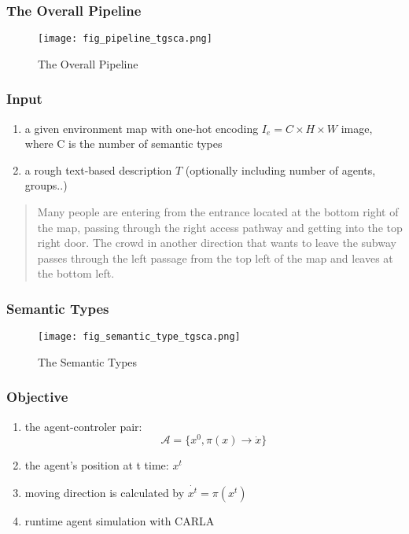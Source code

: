 \begin{frame}
    \frametitle{The Overall Pipeline}
    \begin{figure}
        \texttt{[image: fig\_pipeline\_tgsca.png]}
        \caption{The Overall Pipeline}
    \end{figure}
\end{frame}
\begin{frame}
    \frametitle{Input}
    \begin{enumerate}
        \item a given environment map with one-hot encoding $I_e = C\times H\times W$ image, where C is the number of semantic types
        \item a rough text-based description $T$ (optionally including number of agents, groups..)
    \end{enumerate}
    \begin{quote}
        Many people are entering from the entrance located 
        at the bottom right of the map, 
        passing through the right access pathway 
        and getting into the top right door. 
        The crowd in another direction that 
        wants to leave the subway passes through the left passage 
        from the top left of the map and leaves at the bottom left.
    \end{quote}
\end{frame}
\begin{frame}
    \frametitle{Semantic Types}
    \begin{figure}
        \texttt{[image: fig\_semantic\_type\_tgsca.png]}        
        \caption{The Semantic Types}
    \end{figure}
\end{frame}
\begin{frame}
    \frametitle{Objective}
    \begin{enumerate}
        \item the agent-controler pair: $$\mathcal{A}=\{x^0,\pi(x)\rightarrow \dot{x}\}$$
        \item the agent's position at t time: $x^t$
        \item moving direction is calculated by $\dot{x^t}=\pi(x^t)$
        \item runtime agent simulation with CARLA \cite{dosovitskiyCARLAOpenUrban2017}
    \end{enumerate}
\end{frame}